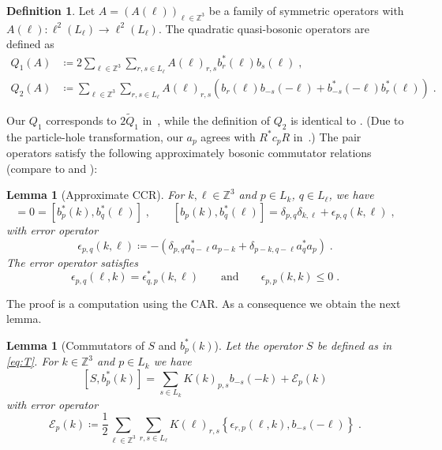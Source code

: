 \documentclass[12pt,a4paper]{article}
\numberwithin{equation}{section}
\newcommand{\1}{\mathbb{I}}
\newcommand{\Zstar}{\mathbb{Z}^3} %
\newcommand{\Z}{\mathbb{Z}}
\theoremstyle{plain}
\newtheorem{lemma}[theorem]{Lemma}
\theoremstyle{definition}
\newtheorem{definition}[theorem]{Definition}
\theoremstyle{remark}
\theoremstyle{plain}
\theoremstyle{definition}
\theoremstyle{remark}
\begin{document}
\begin{definition} \label{def:Q}
Let $A=(A(\ell))_{\ell \in \Zstar} $ be a family of symmetric operators with $A(\ell): \ell^2(L_\ell)\rightarrow \ell^2(L_\ell)$. The quadratic quasi-bosonic operators are defined as
\begin{equation}
\begin{split}
	Q_1(A)&\coloneq 2 \sum_{\ell \in \Zstar}\sum_{r,s \in L_{\ell}}A(\ell)_{r,s} b^*_r(\ell)b_{s}(\ell) \;,\\
	Q_2(A)&\coloneq \sum_{\ell \in \Zstar}\sum_{r,s \in L_{\ell}}A(\ell)_{r,s} \left(b_r(\ell)b_{-s}(-\ell)+b^*_{-s}(-\ell)b^*_{r}(\ell)\right) \;.
\end{split}
\end{equation} 
\end{definition}
Our $ Q_1 $ corresponds to $ 2 \tilde Q_1 $ in~\cite{CHN22}, while the definition of $ Q_2 $ is identical to \cite{CHN22}. (Due to the particle-hole transformation, our $ a_p $ agrees with $ R^* c_p R $ in~\cite{CHN22,CHN23,CHN24}.) The pair operators satisfy the following approximately bosonic commutator relations (compare to \cite[(1.66)]{CHN22} and \cite[Lemma~4.1]{BNP+20}):

\begin{lemma}[Approximate CCR]\label{lem:paircomm}
For $k,\ell \in \Zstar$ and $p \in L_{k}$, $q\in L_{\ell}$, we have
\begin{equation}
	[b_{p}(k),b_{q}(\ell)]
	= 0 = [b^*_{p}(k),b^*_{q}(\ell)]  \;, \qquad
	[b_{p}(k),b^*_{q}(\ell)]
	= \delta_{p,q}\delta_{k,\ell} + \epsilon_{p,q}(k,\ell) \;,
\end{equation}
 with error operator
\begin{equation}
	\epsilon_{p,q}(k,\ell)
	\coloneq -\left(\delta_{p,q}a^*_{q-\ell}a_{p-k} + \delta_{p-k,q-\ell}a^*_{q}a_{p}\right) \;.
\end{equation}
The error operator satisfies
\begin{equation}
\epsilon_{p,q}(\ell,k) = \epsilon^*_{q,p}(k,\ell) \qquad \text{and} \qquad \epsilon_{p,p}(k,k)\leq 0 \;.
\end{equation}
\end{lemma}
The proof is a computation using the CAR. As a consequence we obtain the next lemma.

\begin{lemma}[Commutators of $S $ and $b^*_p(k)$]
Let the operator $S$ be defined as in \eqref{eq:T}. For $k \in \Zstar$ and $p \in L_k$ we have
\begin{equation} \label{eq:comm_Kb}
	[S, b^*_p(k)]
	= \sum_{s\in L_{k}}K(k)_{p,s}b_{-s}(-k)
		+ \mathcal{E}_{p}(k)
\end{equation}
with error operator
\begin{equation}\label{eq:commerrKb}
	\mathcal{E}_{p}(k)
	\coloneq \frac{1}{2}\sum_{\ell\in \Zstar}\sum_{r,s\in L_\ell}K(\ell)_{r,s}\left\{\epsilon_{r,p}(\ell,k),b_{-s}(-\ell)\right\} \;.
\end{equation}
\end{lemma}
\end{document}
